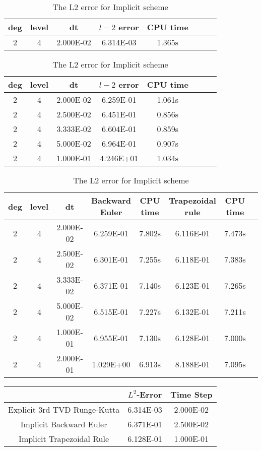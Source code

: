 \documentclass[a4paper]{article}
\begin{document}
\begin{table}[htbp]
\caption{\label{tab:test}3D: The L2 error for Explicit 3rd Runge Kutta with time period=0.5}
\centering
\vspace{5pt}
\begin{tabular}{cccccccc}
\toprule
deg & level&dt&$l-2$ error &CPU time \\
\midrule
2&4&2.000E-02&6.314E-03&1.365s\\
\bottomrule
\end{tabular}
\caption{\label{tab:test}The L2 error for Semi-Implicit Backward Euler}
\centering
\vspace{5pt}

\begin{tabular}{cccccccc}
\toprule
deg & level&dt&$l-2$ error &CPU time \\
\midrule
2&4&2.000E-02&6.259E-01&1.061s\\
2&4&2.500E-02&6.451E-01&0.856s\\
2&4&3.333E-02&6.604E-01&0.859s\\
2&4&5.000E-02&6.964E-01&0.907s\\
2&4&1.000E-01&4.246E+01&1.034s\\
\bottomrule
\end{tabular}


\caption{\label{tab:test}The L2 error for Implicit scheme}
\centering
\vspace{5pt}

\begin{tabular}{cccccccc}
\toprule
deg & level&dt&Backward Euler &CPU time &Trapezoidal rule&CPU time\\
\midrule
2&4&2.000E-02&6.259E-01&7.802s&6.116E-01&7.473s\\
2&4&2.500E-02&6.301E-01&7.255s&6.118E-01&7.383s\\
2&4&3.333E-02&6.371E-01&7.140s&6.123E-01&7.265s\\
2&4&5.000E-02&6.515E-01&7.227s&6.132E-01&7.211s\\
2&4&1.000E-01&6.955E-01&7.130s&6.128E-01&7.000s\\
2&4&2.000E-01&1.029E+00&6.913s&8.188E-01&7.095s\\
\bottomrule
\end{tabular}
\end{table}


\begin{table}
\begin{tabular}{c|c|c}
& $L^2$-Error & Time Step \\ \hline\hline
Explicit 3rd TVD Runge-Kutta  & 6.314E-03 & 2.000E-02\\ \hline
Implicit Backward Euler & 6.371E-01 & 2.500E-02\\ \hline
Implicit Trapezoidal Rule & 6.128E-01 & 1.000E-01\\ \hline
\hline
\end{tabular}
\end{table}
\end{document}
